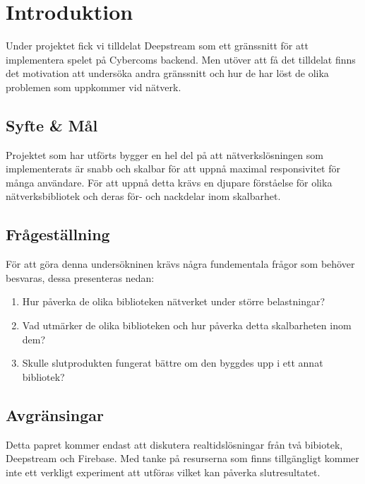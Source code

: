 \section{Introduktion}
\label{sec:tim-introduction}
Under projektet fick vi tilldelat Deepstream som ett gränssnitt för att implementera spelet på Cybercoms backend. Men utöver att få det tilldelat finns det motivation att undersöka andra gränssnitt och hur de har löst de olika problemen som uppkommer vid nätverk.

\subsection{Syfte \& Mål}
\label{subsec:tim-aim}
Projektet som har utförts bygger en hel del på att nätverkslösningen som implementerats är snabb och skalbar för att uppnå maximal responsivitet för många användare. För att uppnå detta krävs en djupare förståelse för olika nätverksbibliotek och deras för- och nackdelar inom skalbarhet.

\subsection{Frågeställning}
\label{subsec:tim-research-questions}
För att göra denna undersökninen krävs några fundementala frågor som behöver besvaras, dessa presenteras nedan:

\begin{enumerate}
\item Hur påverka de olika biblioteken nätverket under större belastningar?

\item Vad utmärker de olika biblioteken och hur påverka detta skalbarheten inom dem?

\item Skulle slutprodukten fungerat bättre om den byggdes upp i ett annat bibliotek?

\end{enumerate}
\subsection{Avgränsingar}
\label{subsec:tim-delimitations}
Detta papret kommer endast att diskutera realtidslösningar från två bibiotek, Deepstream och Firebase. Med tanke på resurserna som finns tillgängligt kommer inte ett verkligt experiment att utföras vilket kan påverka slutresultatet. 


